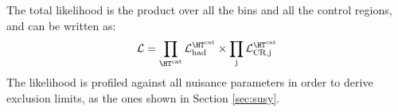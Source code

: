 The total likelihood is the product over all the \htcat bins and all the control regions, and can be written as:
\begin{equation}
\label{eq:total_likelihood}
\mathcal{L} = \prod_{\htcat} \mathcal{L}_{\text{had}}^{\htcat} \times \prod_{\text{j}} \mathcal{L}_{\text{CR,j}}^{\htcat}
\end{equation}
The likelihood is profiled against all nuisance parameters in order to derive exclusion limits, 
as the ones shown in Section \ref{sec:susy}. 




